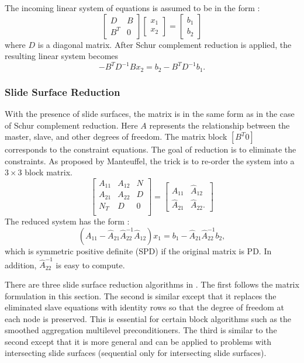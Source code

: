The incoming linear system of equations is assumed to be in the form :
\[ \left[ 
\begin{array}{cc} 
   D   & B \\
   B^T & 0
\end{array}
  \right] 
  \left[
\begin{array}{c} 
   x_1 \\
   x_2
\end{array}
  \right] 
  =
  \left[
\begin{array}{c} 
   b_1 \\
   b_2
\end{array}
  \right] 
\]
where $D$ is a diagonal matrix.  After Schur complement reduction is applied, 
the resulting linear system becomes
$$
- B^T D^{-1} B x_2 = b_2 - B^T D^{-1} b_1.
$$

\subsubsection{Slide Surface Reduction}

With the presence of slide surfaces, the matrix is in the same form as in the
case of Schur complement reduction.  Here $A$ represents the relationship 
between the master, slave, and other degrees of freedom.  The matrix block 
$[B^T 0]$ corresponds to the constraint equations.  The goal of reduction
is to eliminate the constraints.  As proposed by Manteuffel, the trick is
to re-order the system into a $3 \times 3$ block matrix.
\[ 
\left[ 
\begin{array}{ccc} 
   A_{11}  & A_{12} & N \\
   A_{21}  & A_{22} & D \\
   N_{T}   & D      & 0 \\
\end{array}
\right] 
=
\left[ 
\begin{array}{ccc} 
   A_{11}       & \hat{A}_{12} \\
   \hat{A}_{21} & \hat{A}_{22}.
\end{array}
\right] 
\]
The reduced system has the form :
$$
(A_{11} - \hat{A}_{21} \hat{A}_{22}^{-1} \hat{A}_{12}) x_1 =
b_1 - \hat{A}_{21} \hat{A}_{22}^{-1} b_2,
$$
which is symmetric positive definite (SPD) if the original matrix is PD.
In addition, $\hat{A}_{22}^{-1}$ is easy to compute. 

There are three slide surface reduction algorithms in \hypre{}.  
The first follows the matrix formulation in this section.  The second is
similar except that it replaces the eliminated slave equations with
identity rows so that the degree of freedom at each node is preserved.
This is essential for certain block algorithms such as the smoothed
aggregation multilevel preconditioners.
The third is similar to the second except that it is more general and 
can be applied to problems with intersecting slide surfaces (sequential only
for intersecting slide surfaces).

